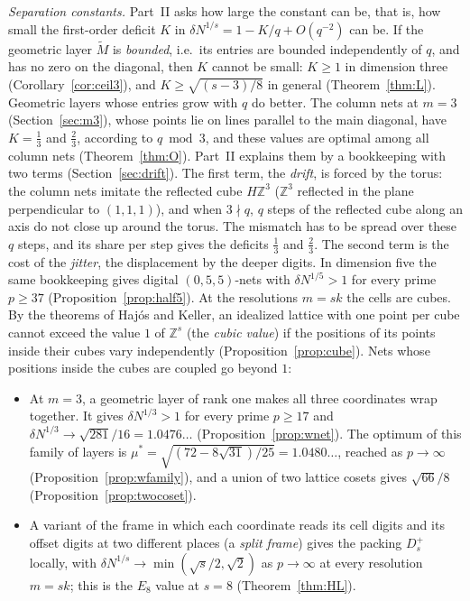 \documentclass[11pt]{amsart}
\theoremstyle{definition}
\theoremstyle{plain}
\newcommand{\Z}{\mathbb{Z}}
\begin{document}
\emph{Separation constants.} Part~II asks how large the constant can be, that is, how small the first-order deficit $K$ in $\delta N^{1/s}=1-K/q+O(q^{-2})$ can be. If the geometric layer $\tilde M$ is \emph{bounded}, i.e.\ its entries are bounded independently of $q$, and has no zero on the diagonal, then $K$ cannot be small: $K\ge1$ in dimension three (Corollary~\ref{cor:ceil3}), and $K\ge\sqrt{(s-3)/8}$ in general (Theorem~\ref{thm:L}). Geometric layers whose entries grow with $q$ do better. The column nets at $m=3$ (Section~\ref{sec:m3}), whose points lie on lines parallel to the main diagonal, have $K=\frac13$ and $\frac23$, according to $q\bmod3$, and these values are optimal among all column nets (Theorem~\ref{thm:O}). Part~II explains them by a bookkeeping with two terms (Section~\ref{sec:drift}). The first term, the \emph{drift}, is forced by the torus: the column nets imitate the reflected cube $H\Z^3$ ($\Z^3$ reflected in the plane perpendicular to $(1,1,1)$), and when $3\nmid q$, $q$ steps of the reflected cube along an axis do not close up around the torus. The mismatch has to be spread over these $q$ steps, and its share per step gives the deficits $\frac13$ and $\frac23$. The second term is the cost of the \emph{jitter}, the displacement by the deeper digits. In dimension five the same bookkeeping gives digital $(0,5,5)$-nets with $\delta N^{1/5}>1$ for every prime $p\ge37$ (Proposition~\ref{prop:half5}). At the resolutions $m=sk$ the cells are cubes. By the theorems of Haj\'os and Keller, an idealized lattice with one point per cube cannot exceed the value $1$ of $\Z^s$ (the \emph{cubic value}) if the positions of its points inside their cubes vary independently (Proposition~\ref{prop:cube}). Nets whose positions inside the cubes are coupled go beyond $1$:
\begin{itemize}
\item At $m=3$, a geometric layer of rank one makes all three coordinates wrap together. It gives $\delta N^{1/3}>1$ for every prime $p\ge17$ and $\delta N^{1/3}\to\sqrt{281}/16=1.0476\ldots$ (Proposition~\ref{prop:wnet}). The optimum of this family of layers is $\mu^*=\sqrt{(72-8\sqrt{31})/25}=1.0480\ldots$, reached as $p\to\infty$ (Proposition~\ref{prop:wfamily}), and a union of two lattice cosets gives $\sqrt{66}/8$ (Proposition~\ref{prop:twocoset}).
\item A variant of the frame in which each coordinate reads its cell digits and its offset digits at two different places (a \emph{split frame}) gives the packing $D_s^+$ locally, with $\delta N^{1/s}\to\min(\sqrt s/2,\sqrt2)$ as $p\to\infty$ at every resolution $m=sk$; this is the $E_8$ value at $s=8$ (Theorem~\ref{thm:HL}).
\end{itemize}
\end{document}
